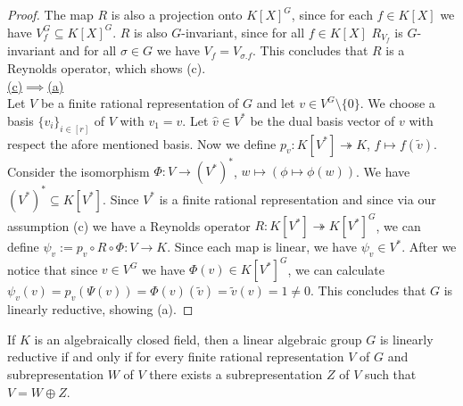 \begin{proof}
  The map $R$ is also a projection onto $K[X]^G$, since for each $f \in K[X]$ we have $V_f^G \subseteq K[X]^G$.
  $R$ is also $G$-invariant, since for all $f \in K[X]$ $R_{V_f}$ is $G$-invariant and for all $\sigma \in G$ we have $V_f = V_{\sigma.f}$.
  This concludes that $R$ is a Reynolds operator, which shows (c).  \\
  \underline{(c)$\implies$(a)}  \\
  Let $V$ be a finite rational representation of $G$ and let $v \in V^G \setminus \{0\}$.
  We choose a basis $\{v_i\}_{i\in [r]}$ of $V$ with $v_1 = v$.
  Let $\hat{v} \in V^\ast$ be the dual basis vector of $v$ with respect the afore mentioned basis.
  Now we define $p_v \colon K[V^\ast] \twoheadrightarrow K$, $f \mapsto f(\tilde{v})$.
  Consider the isomorphism $\Phi \colon V \longrightarrow (V^\ast)^\ast$, $w \mapsto (\phi \mapsto \phi (w))$.
  We have $(V^\ast)^\ast \subseteq K[V^\ast]$.
  Since $V^\ast$ is a finite rational representation and since via our assumption (c) we have a Reynolds operator $R \colon K[V^\ast] \twoheadrightarrow K[V^\ast]^G$, we can define $ \psi_v := p_v \circ R \circ \Phi \colon V \longrightarrow K$.
  Since each map is linear, we have $\psi_v \in V^\ast$.
  After we notice that since $v \in V^G$ we have $\Phi (v) \in K[V^\ast]^G$, we can calculate $\psi_v (v) = p_v (\Psi(v)) = \Phi (v) (\tilde{v}) = \tilde{v} (v) = 1 \neq 0$.
  This concludes that $G$ is linearly reductive, showing (a).
\end{proof}

\begin{theorem}\label{decomp}
  If $K$ is an algebraically closed field, then a linear algebraic group $G$ is linearly reductive if and only if for every finite rational representation $V$ of $G$ and subrepresentation $W$ of $V$ there exists a subrepresentation $Z$ of $V$ such that $V = W \oplus Z$.
\end{theorem}

